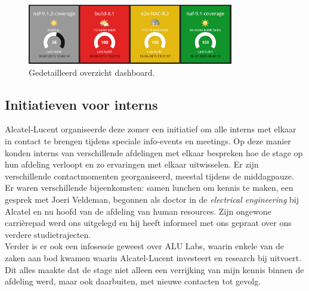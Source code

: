 \documentclass[10pt,a4paper]{article}
\begin{document}
\begin{figure}[ht!]
\centering
\includegraphics[width=90mm]{screenshot2.png}
\caption{Gedetailleerd overzicht dashboard.} 
\label{dash_2}
\end{figure}

\subsection{Initiatieven voor interns}
\label{interns}
Alcatel-Lucent organiseerde deze zomer een initiatief om alle interns met elkaar in contact te brengen tijdens speciale info-events en meetings. Op deze manier konden interns van verschillende afdelingen met elkaar bespreken hoe de stage op hun afdeling verloopt en zo ervaringen met elkaar uitwisselen. Er zijn verschillende contactmomenten georganiseerd, meestal tijdens de middagpauze. Er waren verschillende bijeenkomsten: samen lunchen om kennis te maken, een gesprek met Joeri Veldeman, begonnen als doctor in de \textit{electrical engineering} bij Alcatel en nu hoofd van de afdeling van human resources. Zijn ongewone carri\`erepad werd ons uitgelegd en hij heeft informeel met ons gepraat over ons verdere studietrajecten.\\
Verder is er ook een infosessie geweest over ALU Labs, waarin enkele van de zaken aan bod kwamen waarin Alcatel-Lucent investeert en research bij uitvoert.\\
Dit alles maakte dat de stage niet alleen een verrijking van mijn kennis binnen de afdeling werd, maar ook daarbuiten, met nieuwe contacten tot gevolg.
\end{document}
